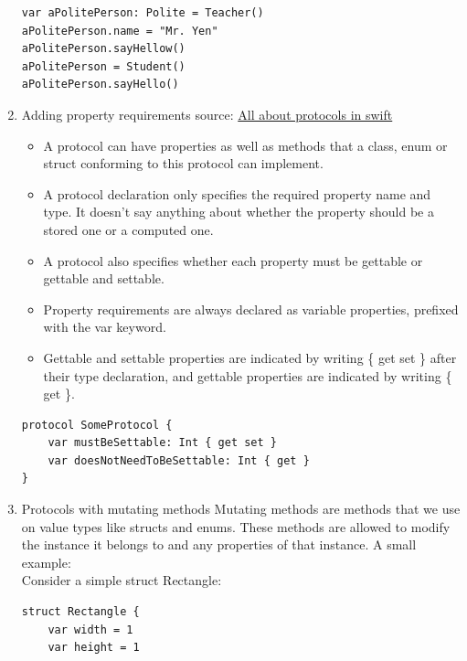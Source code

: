 \documentclass[a4paper,12pt]{article}
\begin{document}
\begin{enumerate}
\begin{lstlisting}
var aPolitePerson: Polite = Teacher()
aPolitePerson.name = "Mr. Yen"
aPolitePerson.sayHellow()
aPolitePerson = Student()
aPolitePerson.sayHello()
\end{lstlisting}
\item Adding property requirements
\label{sec:org069cb1c}
source: \href{https://abhimuralidharan.medium.com/all-about-protocols-in-swift-11a72d6ea354}{All about protocols in swift}\\
\begin{itemize}
\item A protocol can have properties as well as methods that a class, enum or struct conforming to this protocol can implement.\\
\item A protocol declaration only specifies the required property name and type. It doesn’t say anything about whether the property should be a stored one or a computed one.\\
\item A protocol also specifies whether each property must be gettable or gettable and settable.\\
\item Property requirements are always declared as variable properties, prefixed with the var keyword.\\
\item Gettable and settable properties are indicated by writing \{ get set \} after their type declaration, and gettable properties are indicated by writing \{ get \}.\\
\end{itemize}
\lstset{breaklines=true,language=swift,label= ,caption= ,captionpos=b,firstnumber=1,numbers=left}
\begin{lstlisting}
protocol SomeProtocol {
    var mustBeSettable: Int { get set }
    var doesNotNeedToBeSettable: Int { get }
}
\end{lstlisting}
\item Protocols with mutating methods
\label{sec:org95daf92}
Mutating methods are methods that we use on value types like structs and enums. These methods are allowed to modify the instance it belongs to and any properties of that instance. A small example:\\

Consider a simple struct Rectangle:\\
\lstset{breaklines=true,language=swift,label= ,caption= ,captionpos=b,firstnumber=1,numbers=left}
\begin{lstlisting}
struct Rectangle {
    var width = 1
    var height = 1


\end{lstlisting}
\end{enumerate}
\end{document}
